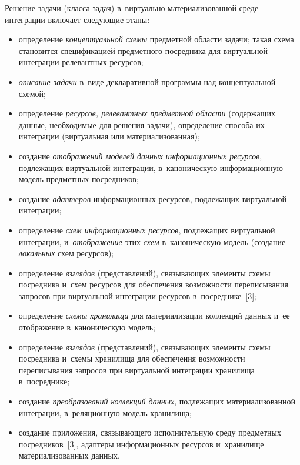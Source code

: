 \begin{multicols}{2}
\vspace*{-2pt}

      Решение задачи (класса задач) в~виртуально-ма\-те\-ри\-а\-ли\-зованной среде 
интеграции включает следующие этапы:
      \begin{itemize}
\item определение \textit{концептуальной схемы} предметной области 
задачи; такая схема становится спецификацией предметного посредника для 
виртуальной интеграции релевантных ресурсов;\\[-13pt]
\item \textit{описание задачи} в~виде декларативной программы над 
концептуальной схемой;\\[-13pt] 
\item определение \textit{ресурсов, релевантных предметной области} 
(содержащих данные, необходимые для решения задачи), определение 
способа их интеграции (виртуальная или материализованная);\\[-13pt]
\item создание \textit{отображений моделей данных информационных 
ресурсов}, подлежащих виртуальной интеграции, в~каноническую 
информационную модель предметных посредников;\\[-13pt]
\item создание \textit{адаптеров} информационных ресурсов, подлежащих 
виртуальной интеграции;\\[-13pt]
\item определение \textit{схем информационных ресурсов}, подлежащих 
виртуальной интеграции, и~\textit{отоб\-ра\-же\-ние} этих \textit{схем} 
в~каноническую модель (создание \textit{локальных} схем ресурсов);\\[-13pt]
\item определение \textit{взглядов} (представлений), связывающих элементы 
схемы посредника и~схем ресурсов для обеспечения возможности 
переписывания запросов при виртуальной интеграции ресурсов 
в~посреднике~[3];\\[-13pt]
\item определение \textit{схемы хранилища} для материализации коллекций 
данных и~ее отображение в~каноническую модель;\\[-13pt]
\item определение \textit{взглядов} (представлений), связывающих элементы 
схемы посредника и~схемы хранилища для обеспечения возможности 
переписывания запросов при виртуальной интеграции хранилища 
в~посреднике;\\[-13pt]
\item создание \textit{преобразований коллекций данных}, подлежащих 
материализованной интеграции, в~реляционную модель хранилища;\\[-13pt]
\item создание приложения, связывающего исполнительную среду 
предметных посредников~[3], адаптеры информационных ресурсов 
и~хранилище материализованных данных.
\end{itemize}


\end{multicols}
